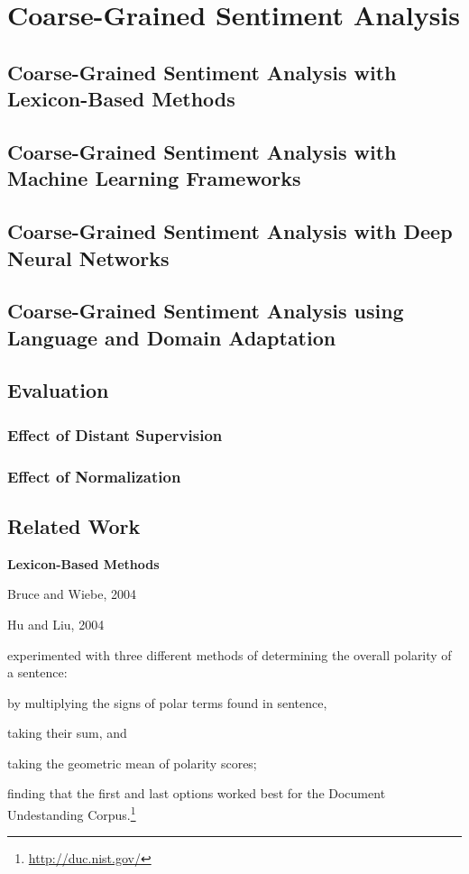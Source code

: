 \chapter{Coarse-Grained Sentiment Analysis}\label{sec:snt:cgsa}

\section{Coarse-Grained Sentiment Analysis with Lexicon-Based Methods}

\section{Coarse-Grained Sentiment Analysis with Machine Learning
  Frameworks}

\section{Coarse-Grained Sentiment Analysis with Deep Neural Networks}

\section{Coarse-Grained Sentiment Analysis using Language and Domain
  Adaptation}

\section{Evaluation}
\subsection{Effect of Distant Supervision}
\subsection{Effect of Normalization}

\section{Related Work}

\textbf{Lexicon-Based Methods}

Bruce and Wiebe, 2004

Hu and Liu, 2004

\citet{Kim:04} experimented with three different methods of
determining the overall polarity of a sentence:
\begin{inparaenum}[(i)]
  \item by multiplying the signs of polar terms found in sentence,
  \item taking their sum, and
  \item taking the geometric mean of polarity scores;
\end{inparaenum}
finding that the first and last options worked best for the Document
Undestanding Corpus.\footnote{\url{http://duc.nist.gov/}}

